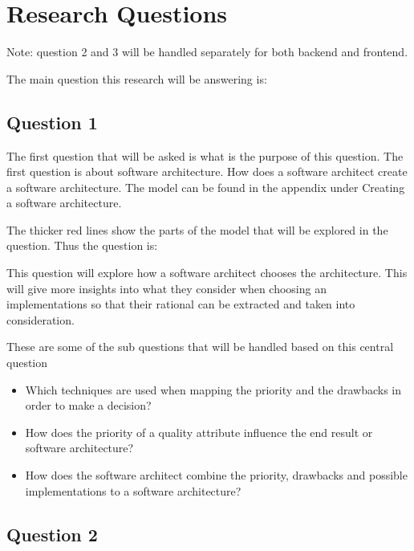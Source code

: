 \section{Research Questions}
Note: question 2 and 3 will be handled separately for both backend and frontend.

The main question this research will be answering is:


\subsection{Question 1}
\label{sec:Question1}
The first question that will be asked is what is the purpose of this question. The first question is about software architecture. How does a software architect create a software architecture. The model can be found in the appendix under Creating a software architecture.

The thicker red lines show the parts of the model that will be explored in the question. Thus the question is:


This question will explore how a software architect chooses the architecture. This will give more insights into what they consider when choosing an implementations so that their rational can be extracted and taken into consideration.

These are some of the sub questions that will be handled based on this central question
\begin{itemize}
	\item Which techniques are used when mapping the priority and the drawbacks in order to make a decision?
	\item How does the priority of a quality attribute influence the end result or software architecture?
	\item How does the software architect combine the priority, drawbacks and possible implementations to a software architecture?
\end{itemize}

\subsection{Question 2}

